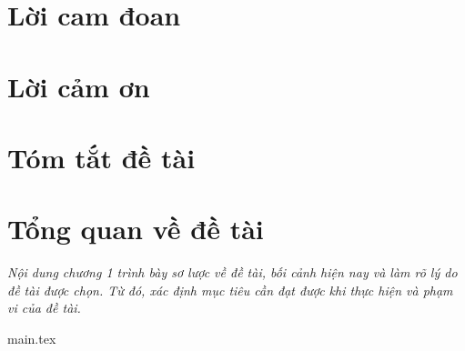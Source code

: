 \documentclass[a4paper, 12pt]{report}
\begin{document}


\pagestyle{empty}



\chapter*{Lời cam đoan}


\chapter*{Lời cảm ơn}


\chapter*{Tóm tắt đề tài}


\tableofcontents

\listoftables%

\listoffigures%


\printglossary[type=\acronymtype,title={Danh mục viết tắt}]

\newpage
\pagestyle{fancy}

\chapter{Tổng quan về đề tài}\label{chap:overview}
\thispagestyle{fancy} %

\textit{Nội dung chương 1 trình bày sơ lược về đề tài, bối cảnh hiện nay và làm rõ lý do đề tài được chọn. Từ đó, xác định mục tiêu cần đạt được khi thực hiện và phạm vi của đề tài.}

{main.tex}
\end{document}
